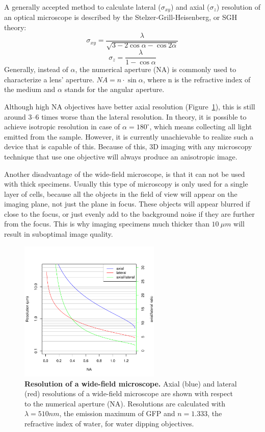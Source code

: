 \documentclass{tdk_style}
\begin{document}
A generally accepted method to calculate lateral ($\sigma_{xy}$) and axial ($\sigma_{z}$) resolution of an optical microscope is described by the Stelzer-Grill-Heisenberg, or SGH theory\cite{grill_method_1999, stelzer_uncertainty_2000}:
\begin{equation} \label{eq:latres}
\sigma_{xy}=\frac{\lambda}{\sqrt{3-2 \cos \alpha - \cos 2 \alpha}}
\end{equation}
\begin{equation} \label{eq:axres}
\sigma_z = \frac{\lambda}{1-\cos \alpha}
\end{equation}
Generally, instead of $\alpha$, the numerical aperture (NA) is commonly used to characterize a lens' aperture. 
$NA=n\cdot \sin \alpha$, where n is the refractive index of the medium and $\alpha$ stands for the angular aperture.

Although high NA objectives have better axial resolution (Figure~\ref{fig:resolution}), this is still around 3--6 times worse than the lateral resolution. In theory, it is possible to achieve isotropic resolution in case of $\alpha = 180^\circ$, which means collecting all light emitted from the sample. However, it is currently unachievable to realize such a device that is capable of this. Because of this, 3D imaging with any microscopy technique that use one objective will always produce an anisotropic image.

Another disadvantage of the wide-field microscope, is that it can not be used with thick specimens. Usually this type of microscopy is only used for a single layer of cells, because all the objects in the field of view will appear on the imaging plane, not just the plane in focus. These objects will appear blurred if close to the focus, or just evenly add to the background noise if they are further from the focus. This is why imaging specimens much thicker than $10\ \mu m$ will result in suboptimal image quality.

\begin{figure}[htpb]
	\centering
	\includegraphics[width=0.6\textwidth]{figures/1_introduction/resolution}
	\caption{\textbf{Resolution of a wide-field microscope.} Axial (blue) and lateral (red) resolutions of a wide-field microscope are shown with respect to the numerical aperture (NA). Resolutions are calculated with $\lambda =510nm$, the emission maximum of GFP and $n=1.333$, the refractive index of water, for water dipping objectives.}
	\label{fig:resolution}
\end{figure}
\end{document}
